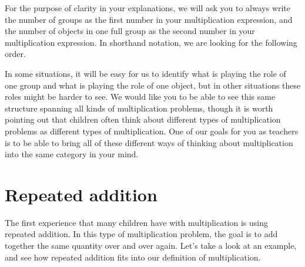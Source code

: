\documentclass{ximera}
\begin{document}
For the purpose of clarity in your explanations, we will ask you to always write the number of groups as the first number in your multiplication expression, and the number of objects in one full group as the second number in your multiplication expression. In shorthand notation, we are looking for the following order.
\begin{image}
\end{image}

In some situations, it will be easy for us to identify what is playing the role of one group and what is playing the role of one object, but in other situations these roles might be harder to see. We would like you to be able to see this same structure spanning all kinds of multiplication problems, though it is worth pointing out that children often think about different types of multiplication problems as different types of multiplication. One of our goals for you as teachers is to be able to bring all of these different ways of thinking about multiplication into the same category in your mind.



\section{Repeated addition}

The first experience that many children have with multiplication is using repeated addition. In this type of multiplication problem, the goal is to add together the same quantity over and over again. Let's take a look at an example, and see how repeated addition fits into our definition of multiplication.
\end{document}
